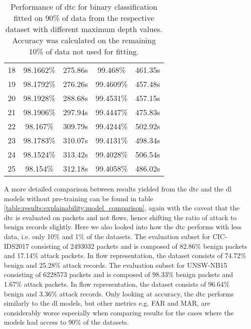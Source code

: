 \begin{table}[!htbp]
\begin{tabular}{c|cc|cc}
		18         & 98.1662\%     & 275.86s          & 99.468\%     & 461.35s        \\
		19         & 98.1792\%     & 276.26s          & 99.4609\%    & 457.48s        \\
		20         & 98.1928\%     & 288.68s          & 99.4531\%    & 457.15s        \\
		21         & 98.1906\%     & 297.94s          & 99.4447\%    & 475.83s        \\
		22         & 98.167\%      & 309.79s          & 99.4244\%    & 502.92s        \\
		23         & 98.1783\%     & 310.07s          & 99.4131\%    & 498.34s        \\
		24         & 98.1524\%     & 313.42s          & 99.4028\%    & 506.54s        \\
		25         & 98.154\%      & 312.18s          & 99.4058\%    & 486.02s       
	\end{tabular}
	\caption{Performance of \gls{dtc} for binary classification fitted on 90\% of data from the respective dataset with different maximum depth values. Accuracy was calculated on the remaining 10\% of data not used for fitting.}
	\label{fig:results:dtc:depth_analysis}
\end{table}

A more detailed comparison between results yielded from the \gls{dtc} and the \gls{dl} models without pre-training can be found in table \ref{table:results:explainability:model_comparison}, again with the caveat that the \gls{dtc} is evaluated on packets and not flows, hence shifting the ratio of attack to benign records slightly. Here we also looked into how the \gls{dtc} performs with less data, i.e. only 10\% and 1\% of the datasets. The evaluation subset for CIC-IDS2017 consisting of 2493032 packets and is composed of 82.86\% benign packets and 17.14\% attack packets. In flow representation, the dataset consists of
74.72\% benign and 25.28\% attack records. The evaluation subset for UNSW-NB15 consisting of 6228573 packets and is composed of 98.33\% benign packets and 1.67\% attack packets. In flow representation, the dataset consists of 
96.64\% benign and 3.36\% attack records. Only looking at accuracy, the \gls{dtc} performs similarly to the \gls{dl} models, but other metrics e.g. FAR and MAR, are considerably worse especially when comparing results for the cases where the models had access to 90\% of the datasets. 

